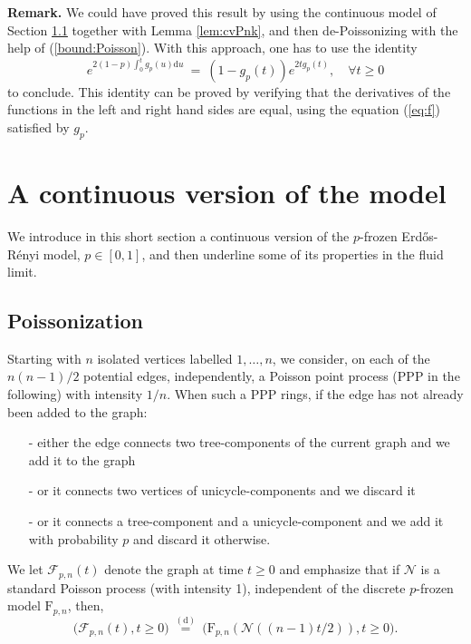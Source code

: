 \documentclass[a4, 11pt]{article}
\numberwithin{equation}{section}
\theoremstyle{plain}
\theoremstyle{definition}
\theoremstyle{remark}
\begin{document}
\bigskip

\textbf{Remark.} We could have proved this result by using the continuous model of Section \ref{sec:Poisson} together with Lemma \ref{lem:cvPnk}, and then de-Poissonizing with the help of (\ref{bound:Poisson}). With this approach, one has to use the identity 
$$
e^{2(1-p)\int_0^t g_p(u) \mathrm du}~=~\left(1-g_p(t)\right)e^{2tg_p(t)}, \quad \forall t \geq 0
$$
to conclude. This identity can be proved by verifying that the derivatives of the functions in the left and right hand sides are equal, using the equation (\ref{eq:f}) satisfied by $g_p$.  


\section{A continuous version of the model}
\label{sec:continuous}

We introduce in this short section a continuous version of the $p$-frozen Erd\H{o}s-R\'enyi model, $p \in [0,1]$, and then underline some of its properties in the fluid limit.


\subsection{Poissonization}
\label{sec:Poisson}

Starting with $n$ isolated vertices labelled $1,\ldots,n$, we consider, on each of the $n(n-1)/2$ potential edges, independently, a Poisson point process (PPP in the following) with intensity $1/n$. When such a PPP rings, if the edge has not already been added to the graph:
\begin{enumerate}[topsep=0pt]
\item[-] either the edge connects two tree-components of the current graph and we add it to the graph
\item[-] or it connects two vertices of unicycle-components and we discard it
\item[-] or it connects a tree-component and a unicycle-component and we add it with probability $p$ and discard it otherwise.
\end{enumerate}
We let $\mathcal {F}_{p,n}(t)$ denote the graph at time $t \geq 0$ and emphasize that if $\mathcal N$ is a standard Poisson process (with intensity 1), independent of the discrete $p$-frozen model $\mathrm{F}_{p,n}$, then,
\begin{equation}
\label{lien:dc}
\big(\mathcal {F}_{p,n}(t), t\geq 0 \big)~\overset{\mathrm{(d)}}{=}~\big(\mathrm{F}_{p,n}\left(\mathcal N((n-1)t/2)\right), t\geq 0 \big).
\end{equation}
\end{document}
